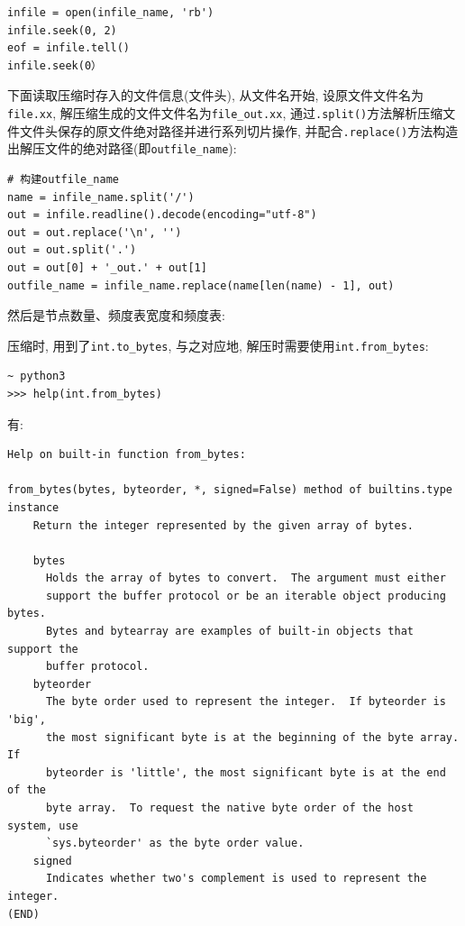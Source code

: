 \documentclass{ctexart}
\begin{document}
{\setmainfont{Courier New Bold}              
\begin{lstlisting}
infile = open(infile_name, 'rb')
infile.seek(0, 2)
eof = infile.tell()
infile.seek(0）
\end{lstlisting}}

下面读取压缩时存入的文件信息(文件头), 从文件名开始, 设原文件文件名为\texttt{file.xx}, 解压缩生成的文件文件名为\texttt{file\_out.xx}, 通过\texttt{.split()}方法解析压缩文件文件头保存的原文件绝对路径并进行系列切片操作, 并配合\texttt{.replace()}方法构造出解压文件的绝对路径(即\texttt{outfile\_name}):

{\setmainfont{Courier New Bold}              
\begin{lstlisting}
# 构建outfile_name
name = infile_name.split('/')
out = infile.readline().decode(encoding="utf-8")
out = out.replace('\n', '')
out = out.split('.')
out = out[0] + '_out.' + out[1]
outfile_name = infile_name.replace(name[len(name) - 1], out)
\end{lstlisting}}

然后是节点数量、频度表宽度和频度表:

压缩时, 用到了\texttt{int.to\_bytes}, 与之对应地, 解压时需要使用\texttt{int.from\_bytes}:

{\setmainfont{Courier New Bold}              
\begin{lstlisting}
~ python3
>>> help(int.from_bytes)
\end{lstlisting}}

有:

{\setmainfont{Courier New Bold}              
\begin{lstlisting}
Help on built-in function from_bytes:

from_bytes(bytes, byteorder, *, signed=False) method of builtins.type instance
    Return the integer represented by the given array of bytes.

    bytes
      Holds the array of bytes to convert.  The argument must either
      support the buffer protocol or be an iterable object producing bytes.
      Bytes and bytearray are examples of built-in objects that support the
      buffer protocol.
    byteorder
      The byte order used to represent the integer.  If byteorder is 'big',
      the most significant byte is at the beginning of the byte array.  If
      byteorder is 'little', the most significant byte is at the end of the
      byte array.  To request the native byte order of the host system, use
      `sys.byteorder' as the byte order value.
    signed
      Indicates whether two's complement is used to represent the integer.
(END)
\end{lstlisting}}
\end{document}
